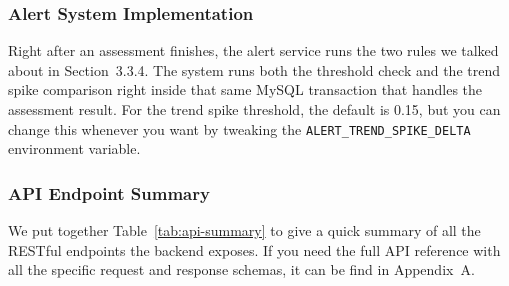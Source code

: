 \documentclass[12pt,a4paper]{article}
\begin{document}
\subsubsection{Alert System Implementation}

Right after an assessment finishes, the alert service runs the two rules we talked about in Section~3.3.4. The system runs both the threshold check and the trend spike comparison right inside that same MySQL transaction that handles the assessment result. For the trend spike threshold, the default is 0.15, but you can change this whenever you want by tweaking the \texttt{ALERT\_TREND\_SPIKE\_DELTA} environment variable.

\subsubsection{API Endpoint Summary}

We put together Table~\ref{tab:api-summary} to give a quick summary of all the RESTful endpoints the backend exposes. If you need the full API reference with all the specific request and response schemas, it can be find in Appendix~A.
\end{document}
